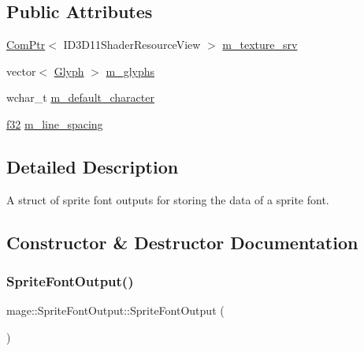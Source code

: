 \subsection*{Public Attributes}
\begin{DoxyCompactItemize}
\item 
\hyperlink{namespacemage_ae74f374780900893caa5555d1031fd79}{Com\+Ptr}$<$ I\+D3\+D11\+Shader\+Resource\+View $>$ \hyperlink{structmage_1_1_sprite_font_output_abece35d0abdacf81538969a3ec8a5617}{m\+\_\+texture\+\_\+srv}
\item 
vector$<$ \hyperlink{structmage_1_1_glyph}{Glyph} $>$ \hyperlink{structmage_1_1_sprite_font_output_aee63c847a919bce662dee371594607dd}{m\+\_\+glyphs}
\item 
wchar\+\_\+t \hyperlink{structmage_1_1_sprite_font_output_a137cca7a8a91c623272b345e9931ca80}{m\+\_\+default\+\_\+character}
\item 
\hyperlink{namespacemage_a6a44ad388483959dc4dff9f2aef91431}{f32} \hyperlink{structmage_1_1_sprite_font_output_a871dbed7a4b8cd00fdda2aa30769726c}{m\+\_\+line\+\_\+spacing}
\end{DoxyCompactItemize}


\subsection{Detailed Description}
A struct of sprite font outputs for storing the data of a sprite font. 

\subsection{Constructor \& Destructor Documentation}
\hypertarget{structmage_1_1_sprite_font_output_a91ed0cd4cb7f9bfab57ff0e3fa4436bc}{}\label{structmage_1_1_sprite_font_output_a91ed0cd4cb7f9bfab57ff0e3fa4436bc} 
\subsubsection{\texorpdfstring{Sprite\+Font\+Output()}{SpriteFontOutput()}\hspace{0.1cm}{\footnotesize\ttfamily [1/3]}}
{\footnotesize\ttfamily mage\+::\+Sprite\+Font\+Output\+::\+Sprite\+Font\+Output (\begin{DoxyParamCaption}{ }\end{DoxyParamCaption})\hspace{0.3cm}{\ttfamily [default]}}

